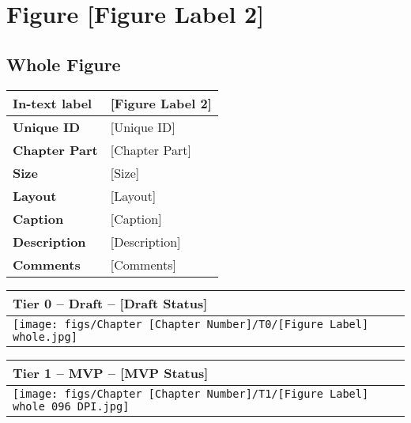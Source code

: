 \clearpage

\section{Figure [Figure Label 2]} \label{sec_[Figure Label 2]}
\setcounter{subsection}{-1}

\small

\subsection{Whole Figure}

\begin{table}[h!] %
\centering
\small %
\sffamily %
\begin{tabular}{| m{4cm} | m{10cm} |}
    \hline
    \textbf{In-text label} & [Figure Label 2] \\
    \hline
    \textbf{Unique ID} & [Unique ID] \\
    \hline
    \textbf{Chapter Part} & [Chapter Part] \\
    \hline
    \textbf{Size} & [Size] \\
    \hline
    \textbf{Layout} & [Layout] \\
    \hline
    \textbf{Caption} & [Caption] \\
    \hline
    \textbf{Description} & [Description] \\
    \hline
    \textbf{Comments} & [Comments] \\
    \hline
    \end{tabular}
\end{table}

\begin{table}[h!] %
\centering
\small %
\sffamily %
\begin{tabular}{| m{14.5cm} |}
    \hline
    \textbf{Tier 0 -- Draft -- [Draft Status]}   \\
    \hline
    \hspace{5pt} \texttt{[image: figs/Chapter [Chapter Number]/T0/[Figure Label] whole.jpg]} \\
    \hline
    \end{tabular}
\end{table}

\begin{table}[h!] %
\centering
\small %
\sffamily %
\begin{tabular}{| m{14.5cm} |}
    \hline
    \textbf{Tier 1 -- MVP -- [MVP Status]} \\
    \hline
    \hspace{5pt} \texttt{[image: figs/Chapter [Chapter Number]/T1/[Figure Label] whole 096 DPI.jpg]} \\
    \hline
    \end{tabular}
\end{table}
